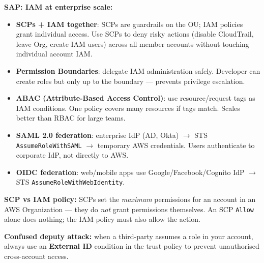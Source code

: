 \begin{sapdepth}
\textbf{SAP: IAM at enterprise scale:}
\begin{itemize}
  \item \textbf{SCPs + IAM together}: SCPs are guardrails on the OU; IAM policies grant
        individual access. Use SCPs to deny risky actions (disable CloudTrail, leave Org, create IAM users)
        across all member accounts without touching individual account IAM.
  \item \textbf{Permission Boundaries}: delegate IAM administration safely.
        Developer can create roles but only up to the boundary --- prevents privilege escalation.
  \item \textbf{ABAC (Attribute-Based Access Control)}: use resource/request tags as IAM
        conditions. One policy covers many resources if tags match.
        Scales better than RBAC for large teams.
  \item \textbf{SAML 2.0 federation}: enterprise IdP (AD, Okta) $\rightarrow$ STS
        \texttt{AssumeRoleWithSAML} $\rightarrow$ temporary AWS credentials.
        Users authenticate to corporate IdP, not directly to AWS.
  \item \textbf{OIDC federation}: web/mobile apps use Google/Facebook/Cognito IdP
        $\rightarrow$ STS \texttt{AssumeRoleWithWebIdentity}.
\end{itemize}
\end{sapdepth}

\begin{examtip}
\textbf{SCP vs IAM policy:} SCPs set the \emph{maximum} permissions for an account
in an AWS Organization --- they do \emph{not} grant permissions themselves. An SCP
\texttt{Allow} alone does nothing; the IAM policy must also allow the action.
\end{examtip}

\begin{gotcha}
\textbf{Confused deputy attack:} when a third-party assumes a role in your account,
always use an \textbf{External ID} condition in the trust policy to prevent
unauthorised cross-account access.
\end{gotcha}
